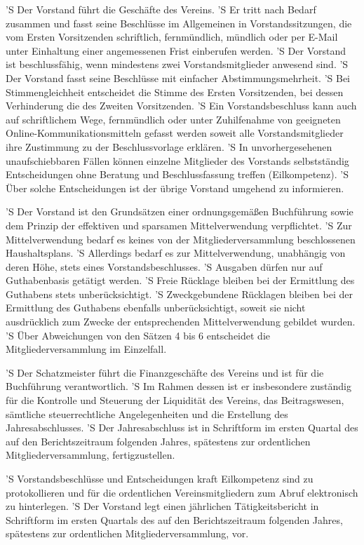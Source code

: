 \documentclass[a4paper,10pt]{scrreprt}
\begin{document}
\begin{contract}
'S Der Vorstand führt die Geschäfte des Vereins.
'S Er tritt nach Bedarf zusammen und fasst seine Beschlüsse im Allgemeinen in
Vorstandssitzungen, die vom Ersten Vorsitzenden schriftlich, fernmündlich,
mündlich oder per E-Mail unter Einhaltung einer angemessenen Frist einberufen
werden.
'S Der Vorstand ist beschlussfähig, wenn mindestens zwei Vorstandsmitglieder
anwesend sind.
'S Der Vorstand fasst seine Beschlüsse mit einfacher Abstimmungsmehrheit.
'S Bei Stimmengleichheit entscheidet die Stimme des Ersten Vorsitzenden, bei
dessen Verhinderung die des Zweiten Vorsitzenden.
'S Ein Vorstandsbeschluss kann auch auf schriftlichem Wege, fernmündlich oder
unter Zuhilfenahme von geeigneten Online-Kommunikationsmitteln gefasst werden
soweit alle Vorstandsmitglieder ihre Zustimmung zu der Beschlussvorlage
erklären.
'S In unvorhergesehenen unaufschiebbaren Fällen können einzelne Mitglieder des
Vorstands selbstständig Entscheidungen ohne Beratung und Beschlussfassung
treffen (Eilkompetenz).
'S Über solche Entscheidungen ist der übrige Vorstand umgehend zu informieren.

'S Der Vorstand ist den Grundsätzen einer ordnungsgemäßen Buchführung sowie dem
Prinzip der effektiven und sparsamen Mittelverwendung verpflichtet.
'S Zur Mittelverwendung bedarf es keines von der Mitgliederversammlung
beschlossenen Haushaltsplans.
'S Allerdings bedarf es zur Mittelverwendung, unabhängig von deren Höhe, stets
eines Vorstandsbeschlusses.
'S Ausgaben dürfen nur auf Guthabenbasis getätigt werden.
'S Freie Rücklage bleiben bei der Ermittlung des Guthabens stets
unberücksichtigt.
'S Zweckgebundene Rücklagen bleiben bei der Ermittlung des Guthabens ebenfalls
unberücksichtigt, soweit sie nicht ausdrücklich zum Zwecke der entsprechenden
Mittelverwendung gebildet wurden.
'S Über Abweichungen von den Sätzen 4 bis 6 entscheidet die
Mitgliederversammlung im Einzelfall.

'S Der Schatzmeister führt die Finanzgeschäfte des Vereins und ist für die
Buchführung verantwortlich.
'S Im Rahmen dessen ist er insbesondere zuständig für die Kontrolle und
Steuerung der Liquidität des Vereins, das Beitragswesen, sämtliche
steuerrechtliche Angelegenheiten und die Erstellung des Jahresabschlusses.
'S Der Jahresabschluss ist in Schriftform im ersten Quartal des auf den
Berichtszeitraum folgenden Jahres, spätestens zur ordentlichen
Mitgliederversammlung, fertigzustellen.

'S Vorstandsbeschlüsse und Entscheidungen kraft Eilkompetenz sind zu
protokollieren und für die ordentlichen Vereinsmitgliedern zum Abruf
elektronisch zu hinterlegen.
'S Der Vorstand legt einen jährlichen Tätigkeitsbericht in Schriftform im
ersten Quartals des auf den Berichtszeitraum folgenden Jahres, spätestens zur
ordentlichen Mitgliederversammlung, vor.


\end{contract}
\end{document}
